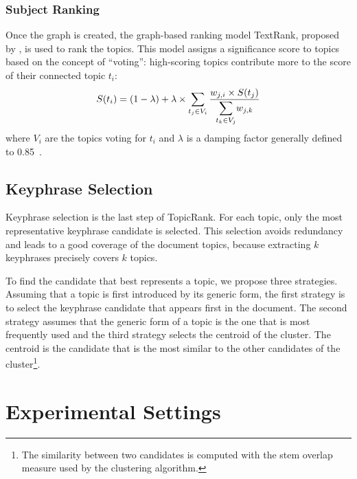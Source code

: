     \subsubsection{Subject Ranking}
    \label{subsubsec:ranking}
      Once the graph is created, the graph-based ranking model TextRank,
      proposed by , is used to rank the topics.
      This model assigns a significance score to topics based on the concept of
      ``voting'': high-scoring topics contribute more to the score of their
      connected topic $t_i$:
      \begin{align}
        S(t_i) = (1 - \lambda) + \lambda \times \sum_{t_j \in V_i} \frac{w_{j, i} \times S(t_j)}{\mathlarger{\sum}_{t_k \in V_j} w_{j, k}} \label{math:textrank}
      \end{align}
      where $V_i$ are the topics voting for $t_i$ and $\lambda$ is a damping
      factor generally defined to 0.85~\cite{brin1998pagerank}.

  \subsection{Keyphrase Selection}
  \label{subsec:keyphrase_selection}
    Keyphrase selection is the last step of TopicRank. For each topic, only the
    most representative keyphrase candidate is selected. This selection avoids
    redundancy and leads to a good coverage of the document topics, because
    extracting $k$ keyphrases precisely covers $k$ topics.

    To find the candidate that best represents a topic, we propose three
    strategies. Assuming that a topic is first introduced by its generic form,
    the first strategy is to select the keyphrase candidate that appears first
    in the document. The second strategy assumes that the generic form of a
    topic is the one that is most frequently used and the third strategy selects
    the centroid of the cluster. The centroid is the candidate that is the most
    similar to the other candidates of the cluster\footnote{The similarity
    between two candidates is computed with the stem overlap measure used by the
    clustering algorithm.}.

\section{Experimental Settings}
\label{sec:experimental_settings}
